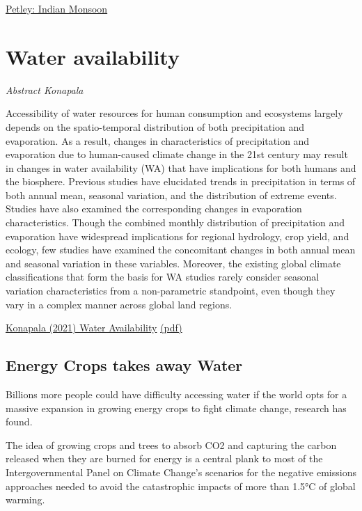 \documentclass[
]{book}
\begin{document}
\href{https://blogs.agu.org/landslideblog/2021/04/15/future-warming-1/}{Petley: Indian Monsoon}

\hypertarget{water-availability}{%
\section{Water availability}\label{water-availability}}

\emph{Abstract Konapala}

Accessibility of water resources for human consumption and ecosystems largely depends on the spatio-temporal distribution of both precipitation and evaporation.
As a result, changes in characteristics of precipitation and evaporation due to human-caused climate change in the 21st century may result in changes in water availability (WA) that have implications for both humans and the biosphere.
Previous studies have elucidated trends in precipitation in terms of both annual mean, seasonal variation, and the distribution of extreme events. Studies have also examined the corresponding changes in evaporation characteristics.
Though the combined monthly distribution of precipitation and evaporation have widespread implications for regional hydrology, crop yield, and ecology, few studies have examined the concomitant changes in both annual mean and seasonal variation in these variables.
Moreover, the existing global climate classifications that form the basis for WA studies rarely consider seasonal variation characteristics from a non-parametric standpoint, even though they vary in a complex manner across global land regions.

\href{https://www.nature.com/articles/s41467-020-16757-w}{Konapala (2021) Water Availability}
\href{pdf/Konapala_2021_Water_Availability.pdf}{(pdf)}

\hypertarget{energy-crops-takes-away-water}{%
\subsection{Energy Crops takes away Water}\label{energy-crops-takes-away-water}}

Billions more people could have difficulty accessing water if the world opts for a massive expansion in growing energy crops to fight climate change, research has found.

The idea of growing crops and trees to absorb CO2 and capturing the carbon released when they are burned for energy is a central plank to most of the Intergovernmental Panel on Climate Change's scenarios for the negative emissions approaches needed to avoid the catastrophic impacts of more than 1.5°C of global warming.
\end{document}
